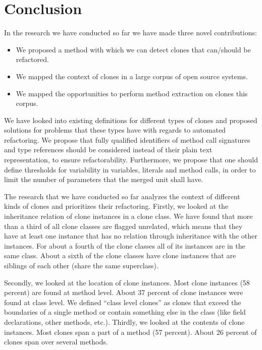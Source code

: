\chapter{Conclusion}
\label{ch:conclusion}
In the research we have conducted so far we have made three novel contributions:
\begin{itemize}
    \item We proposed a method with which we can detect clones that can/should be refactored.
    \item We mapped the context of clones in a large corpus of open source systems.
    \item We mapped the opportunities to perform method extraction on clones this corpus.
\end{itemize}

We have looked into existing definitions for different types of clones \cite{roy2007survey} and proposed solutions for problems that these types have with regards to automated refactoring. We propose that fully qualified identifiers of method call signatures and type references should be considered instead of their plain text representation, to ensure refactorability. Furthermore, we propose that one should define thresholds for variability in variables, literals and method calls, in order to limit the number of parameters that the merged unit shall have.

The research that we have conducted so far analyzes the context of different kinds of clones and prioritizes their refactoring. Firstly, we looked at the inheritance relation of clone instances in a clone class. We have found that more than a third of all clone classes are flagged unrelated, which means that they have at least one instance that has no relation through inheritance with the other instances. For about a fourth of the clone classes all of its instances are in the same class. About a sixth of the clone classes have clone instances that are siblings of each other (share the same superclass).

Secondly, we looked at the location of clone instances. Most clone instances (58 percent) are found at method level. About 37 percent of clone instances were found at class level. We defined ``class level clones'' as clones that exceed the boundaries of a single method or contain something else in the class (like field declarations, other methods, etc.). Thirdly, we looked at the contents of clone instances. Most clones span a part of a method (57 percent). About 26 percent of clones span over several methods.

